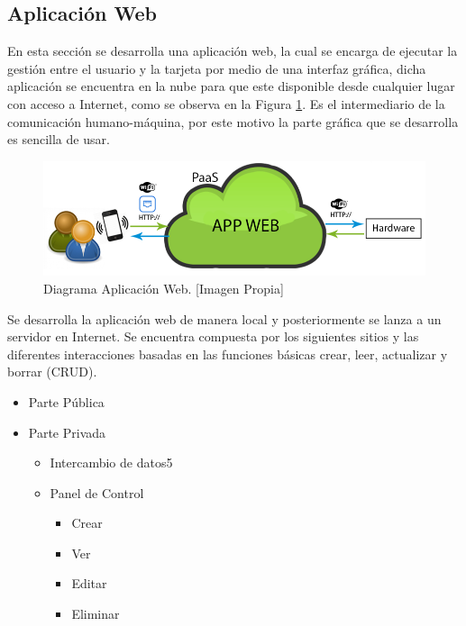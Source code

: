 
\subsection{Aplicación Web}

En esta sección se desarrolla una aplicación web, la cual se encarga de ejecutar la gestión entre el usuario y la tarjeta por medio de una interfaz gráfica, dicha aplicación se encuentra en la nube para que este disponible desde cualquier lugar con acceso a Internet, como se observa en la Figura \ref{fig:B_appwD}. Es el intermediario de la comunicación humano-máquina, por este motivo la parte gráfica que se desarrolla es sencilla de usar.\\

\begin{figure}[H]
	\centering
	\caption[Diagrama Aplicación Web.]{Diagrama Aplicación Web. [Imagen Propia]}
	\label{fig:B_appwD}
	\includegraphics[width=0.7\linewidth]{Imagenes/B_AppWebDllo}
\end{figure}

Se desarrolla la aplicación web de manera local y posteriormente se lanza a un servidor en Internet. Se encuentra compuesta por los siguientes sitios y las diferentes interacciones basadas en las funciones básicas crear, leer, actualizar y borrar (CRUD).\\

\begin{itemize}
	\item Parte Pública
	\item Parte Privada
	\begin{itemize}
		\item Intercambio de datos5
		\item Panel de Control
		\begin{itemize}
			\item Crear
			\item Ver
			\item Editar
			\item Eliminar 
		\end{itemize}
	\end{itemize}
\end{itemize}

